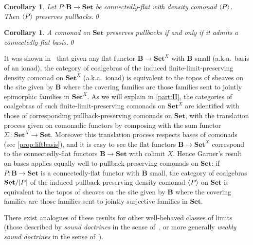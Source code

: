 \documentclass[11pt, oneside, article]{memoir}
\theoremstyle{plain}
\newtheorem{corollary}[theorem]{Corollary}
\theoremstyle{definition}
\theoremstyle{remark}
\newenvironment{remark}
{\renewcommand\qedsymbol{$\lrcorner$}%
  \pushQED{\qed}\myremark}
{\popQED\endmyremark}
\DeclarePairedDelimiter{\gen}{\langle}{\rangle}
\DeclarePairedDelimiter{\abs}{\lvert}{\rvert}
\newcommand{\bang}{\mathrm{!}}
\newcommand{\namedcat}[1]{\mathbf{#1}}
\newcommand{\cat}[1]{\mathbf{#1}}
\newcommand{\Set}{\namedcat{Set}}
\newcommand{\pts}[1]{{\abs{#1}}}
\newcommand{\slicel}{\Sigma_\bang}
\newcommand{\ph}[1]{#1}
\newcommand{\bB}{\cat{B}}
\newcommand{\pP}{\ph{P}}
\newcommand{\cP}{\gen{\pP}}
\newcommand{\SetP}{\Set/\pts{\pP}}
\begin{document}
\begin{corollary}\label{cor:connpb}
  Let $\pP \colon \bB \to \Set$ be connectedly-flat with density
  comonad $\cP$. Then $\cP$ preserves pullbacks.\qed
\end{corollary}

\begin{corollary}\label{cor:pb}
  A comonad on $\Set$ preserves pullbacks if and only if it admits a
  connectedly-flat basis.\qed
\end{corollary}

\begin{remark}
  It was shown in~\cite[Proposition 3.4]{garner:ionads} that given any
  flat functor $\bB \to \Set^X$ with $\bB$ small (a.k.a.\ basis of an
  ionad), the category of coalgebras of the induced
  finite-limit-preserving density comonad on $\Set^X$ (a.k.a.\ ionad)
  is equivalent to the topos of sheaves on the site given by $\bB$
  where the covering families are those families sent to jointly
  epimorphic families in $\Set^X$. As we will explain in
  \cref{part:II}, the categories of coalgebras of such
  finite-limit-preserving comonads on $\Set^X$ are identified with
  those of corresponding pullback-preserving comonads on $\Set$, with
  the translation process given on comonadic functors by composing
  with the sum functor $\slicel \colon \Set^X \to \Set$. Moreover this
  translation process respects bases of comonads (see
  \cref{prop:liftbasis}), and it is easy to see the flat functors
  $\bB \to \Set^X$ correspond to the connectedly-flat functors
  $\bB \to \Set$ with colimit $X$. Hence Garner's result on bases
  applies equally well to pullback-preserving comonads on $\Set$: if
  $\pP \colon \bB \to \Set$ is a connectedly-flat functor with $\bB$
  small, the category of coalgebras $\SetP$ of the induced
  pullback-preserving density comonad $\cP$ on $\Set$ is equivalent to
  the topos of sheaves on the site given by $\bB$ where the covering
  families are those families sent to jointly surjective families in
  $\Set$.
\end{remark}

\begin{remark}
  There exist analogues of these results for other well-behaved
  classes of limits (those described by \emph{sound doctrines} in the
  sense of~\cite{adamek-borceux-lack-rosicky}, or more generally
  \emph{weakly sound doctrines} in the sense of~\cite{tendas}).
\end{remark}
\end{document}
